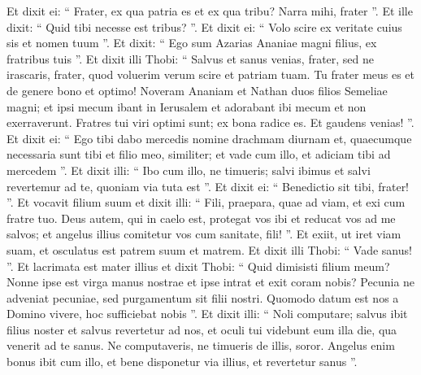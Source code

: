 \begin{biblechapter}
\begin{biblechapter}
\begin{biblechapter}
\begin{biblechapter}
\begin{biblechapter}
\verse Et dixit ei: “ Frater, ex qua patria es et ex qua tribu? Narra mihi, frater ”. 
\verse Et ille dixit: “ Quid tibi necesse est tribus? ”. Et dixit ei: “ Volo scire ex veritate cuius sis et nomen tuum ”. 
 \verse Et dixit: “ Ego sum Azarias Ananiae magni filius, ex fratribus tuis ”.
 \verse Et dixit illi Thobi: “ Salvus et sanus venias, frater, sed ne irascaris, frater, quod voluerim verum scire et patriam tuam. Tu frater meus es et de genere bono et optimo! Noveram Ananiam et Nathan duos filios Semeliae magni; et ipsi mecum ibant in Ierusalem et adorabant ibi mecum et non exerraverunt. Fratres tui viri optimi sunt; ex bona radice es. Et gaudens venias! ”. 
\verse Et dixit ei: “ Ego tibi dabo mercedis nomine drachmam diurnam et, quaecumque necessaria sunt tibi et filio meo, similiter; et vade cum illo, 
\verse et adiciam tibi ad mercedem ”. 
\verse Et dixit illi: “ Ibo cum illo, ne timueris; salvi ibimus et salvi revertemur ad te, quoniam via tuta est ”. Et dixit ei: “ Benedictio sit tibi, frater! ”. Et vocavit filium suum et dixit illi: “ Fili, praepara, quae ad viam, et exi cum fratre tuo. Deus autem, qui in caelo est, protegat vos ibi et reducat vos ad me salvos; et angelus illius comitetur vos cum sanitate, fili! ”.
 Et exiit, ut iret viam suam, et osculatus est patrem suum et matrem. Et dixit illi Thobi: “ Vade sanus! ”. 
\verse Et lacrimata est mater illius et dixit Thobi: “ Quid dimisisti filium meum? Nonne ipse est virga manus nostrae et ipse intrat et exit coram nobis? 
\verse Pecunia ne adveniat pecuniae, sed purgamentum sit filii nostri. 
\verse Quomodo datum est nos a Domino vivere, hoc sufficiebat nobis ”. 
\verse Et dixit illi: “ Noli computare; salvus ibit filius noster et salvus revertetur ad nos, et oculi tui videbunt eum illa die, qua venerit ad te sanus. Ne computaveris, ne timueris de illis, soror. 
\verse Angelus enim bonus ibit cum illo, et bene disponetur via illius, et revertetur sanus ”.
 

\end{biblechapter}
\end{biblechapter}
\end{biblechapter}
\end{biblechapter}
\end{biblechapter}
